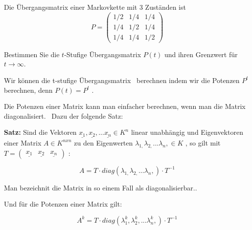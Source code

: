 \begin{uebsp}
\begin{Exercise}[label=ex:4.5]
Die Übergangsmatrix einer Markovkette mit 3 Zuständen ist
\[P=\left(\begin{array}{ccc}
1/2 & 1/4 & 1/4\\
1/4 & 1/2 & 1/4\\
1/4 & 1/4 & 1/2
\end{array}\right)\]

Bestimmen Sie die $t$-Stufige Übergangsmatrix $P(t)$ und ihren Grenzwert für $t\rightarrow\infty$.
\end{Exercise}

\begin{Answer}

\bigskip

{
Wir k\"onnen die t-stufige \"Ubergangsmatrix \ berechnen indem wir die
Potenzen  $P^{t}$ berechnen, denn  $P(t)=P^{t}$ .}


\bigskip

{
Die Potenzen einer Matrix kann man einfacher berechnen, wenn man die
Matrix diagonalisiert. \ Dazu der folgende Satz:}


\bigskip

{
\textbf{Satz: }Sind die Vektoren 
$\underline{{x_{1}}},\underline{{x_{2}}},...\underline{{x_{n}}}\in
K^{n}$ linear unabh\"angig und Eigenvektoren einer Matrix  $A\in
K^{\mathit{nxn}}$ zu den Eigenwerten  $\lambda _{1,}\lambda
_{2,}...\lambda _{n},\in K$ , so gilt mit 
$T=(\begin{matrix}\underline{{x_{1}}}&\underline{{x_{2}}}&\underline{{x_{n}}}\end{matrix})$
:}


\bigskip


\bigskip

\begin{equation*}
A=T\cdot \mathit{diag}(\lambda _{1,}\lambda _{2,}...\lambda _{n},)\cdot
T^{-1}
\end{equation*}

\bigskip

{
Man bezeichnit die Matrix in so einem Fall als diagonalisierbar..}


\bigskip

{
Und f\"ur die Potenzen einer Matrix gilt:}


\bigskip

\begin{equation*}
A^{k}=T\cdot \mathit{diag}(\lambda _{1}^{k},\lambda _{2}^{k},...\lambda
_{n}^{k},)\cdot T^{-1}
\end{equation*}


\end{Answer}
\end{uebsp}

